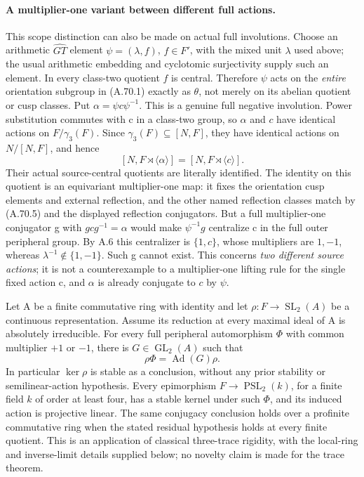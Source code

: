 \paragraph{A multiplier-one variant between different full actions.}
This scope distinction can also be made on actual full involutions.
Choose an arithmetic \(\widehat{GT}\) element
\(\psi=(\lambda,f)\), \(f\in F'\), with the mixed unit
\(\lambda\) used above; the usual arithmetic embedding and cyclotomic
surjectivity supply such an element. In every class-two quotient
\(f\) is central. Therefore \(\psi\) acts on the \emph{entire} orientation
subgroup in (A.70.1) exactly as \(\theta\), not merely on its abelian
quotient or cusp classes. Put \(\alpha=\psi c\psi^{-1}\).
This is a genuine full negative involution. Power substitution
commutes with c in a class-two group, so \(\alpha\) and \(c\) have identical
actions on \(F/\gamma_3(F)\). Since
\(\gamma_3(F)\subseteq[N,F]\), they have identical actions
on \(N/[N,F]\), and hence
\[
 [N,F\rtimes\langle\alpha\rangle]
       =[N,F\rtimes\langle c\rangle].
 \tag{A.70.6}
\]
Their actual source-central quotients are literally identified.
The identity on this quotient is an equivariant multiplier-one
map: it fixes the orientation cusp elements and external
reflection, and the other named reflection classes match by
(A.70.5) and the displayed reflection conjugators.
But a full multiplier-one conjugator g with
\(gcg^{-1}=\alpha\) would make \(\psi^{-1}g\) centralize c
in the full outer peripheral group. By A.6 this centralizer is
\(\{1,c\}\), whose multipliers are \(1,-1\), whereas
\(\lambda^{-1}\notin\{1,-1\}\). Such g cannot exist.
This concerns \emph{two different source actions}; it is not a
counterexample to a multiplier-one lifting rule for the single
fixed action c, and \(\alpha\) is already conjugate to \(c\) by \(\psi\).

Let A be a finite commutative ring with identity and let
\(\rho:F\to\operatorname{SL}_2(A)\) be a continuous
representation. Assume its reduction at every maximal ideal of
A is absolutely irreducible. For every full peripheral
automorphism \(\Phi\) with common multiplier \(+1\) or \(-1\),
there is \(G\in\operatorname{GL}_2(A)\) such that
\[
                   \rho\Phi=\operatorname{Ad}(G)\rho.
 \tag{A.71.1}
\]
In particular \(\ker\rho\) is stable as a conclusion, without
any prior stability or semilinear-action hypothesis. Every
epimorphism \(F\to\operatorname{PSL}_2(k)\), for a finite
field \(k\) of order at least four, has a stable kernel under
such \(\Phi\), and its induced action is projective linear.
The same conjugacy conclusion holds over a profinite commutative
ring when the stated residual hypothesis holds at every finite
quotient. This is an application of classical three-trace
rigidity, with the local-ring and inverse-limit details supplied
below; no novelty claim is made for the trace theorem.
\cite{CEMcCulloughWanderley2013}


